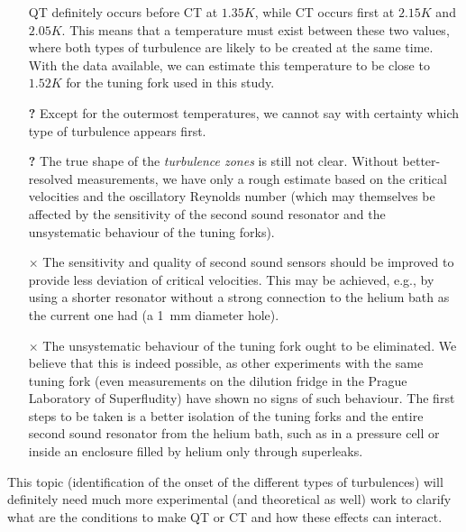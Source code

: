 \begin{itemize}
	\item[\checkmark] QT definitely occurs before CT at $ 1.35\unit{K} $, while CT occurs first at $ 2.15\unit{K} $ and $ 2.05\unit{K} $. This means that a temperature must exist between these two values, where both types of turbulence are likely to be created at the same time. With the data available, we can estimate this temperature to be close to $ 1.52\unit{K} $ for the tuning fork used in this study.
	
	\item[\textbf{?}] Except for the outermost temperatures, we cannot say with certainty which type of turbulence appears first.

	\item[\textbf{?}] The true shape of the \textit{turbulence zones} is still not clear. Without better-resolved measurements, we have only a rough estimate based on the critical velocities and the oscillatory Reynolds number (which may themselves be affected by the sensitivity of the second sound resonator and the unsystematic behaviour of the tuning forks).
	
	\item[$\times$] The sensitivity and quality of second sound sensors should be improved to provide less deviation of critical velocities. This may be achieved, e.g., by using a shorter resonator without a strong connection to the helium bath as the current one had (a 1~mm diameter hole).
	
	\item[$ \times $] The unsystematic behaviour of the tuning fork ought to be eliminated. We believe that this is indeed possible, as other experiments with the same tuning fork (even measurements on the dilution fridge in the Prague Laboratory of Superfludity) have shown no signs of such behaviour. The first steps to be taken is a better isolation of the tuning forks and the entire second sound resonator from the helium bath, such as in a pressure cell or inside an enclosure filled by helium only through superleaks.
\end{itemize}

This topic (identification of the onset of the different types of turbulences) will definitely need much more experimental (and theoretical as well) work to clarify what are the conditions to make QT or CT and how these effects can interact.